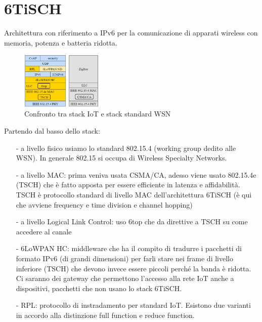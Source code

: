\documentclass[12pt,italian]{report}
\begin{document}
\section{6TiSCH}
Architettura con riferimento a IPv6 per la comunicazione di apparati wireless con memoria, potenza e batteria ridotta. 
\begin{figure}[h]
\centering
\includegraphics[width=40mm]{img/boh.PNG}
\caption{Confronto tra stack IoT e stack standard WSN}
\label{fig:oode}
\end{figure}
Partendo dal basso dello stack:
\begin{itemize}
    \item [-] a livello fisico usiamo lo standard 802.15.4 (working group dedito alle WSN). In generale 802.15 si occupa di Wireless Specialty Networks. 
    \item [-] a livello MAC: prima veniva usata CSMA/CA, adesso viene usato 802.15.4e (TSCH) che è fatto apposta per essere efficiente in latenza e affidabilità. TSCH è protocollo standard di livello MAC dell'architettura 6TiSCH (è qui che avviene frequency e time division e channel hopping)
    \item [-] a livello Logical Link Control: uso 6top che da direttive a TSCH su come accedere al canale
    \item [-] 6LoWPAN HC: middleware che ha il compito di tradurre i pacchetti di formato IPv6 (di grandi dimensioni) per farli stare nei frame di livello inferiore (TSCH) che devono invece essere piccoli perché la banda è ridotta. Ci saranno dei gateway che permettono l'accesso alla rete IoT anche a dispositivi, pacchetti che non usano lo stack 6TiSCH. 
    \item[-] RPL: protocollo di instradamento per standard IoT. Esistono due varianti in accordo alla distinzione full function e reduce function. 
    
\end{itemize}
\end{document}
